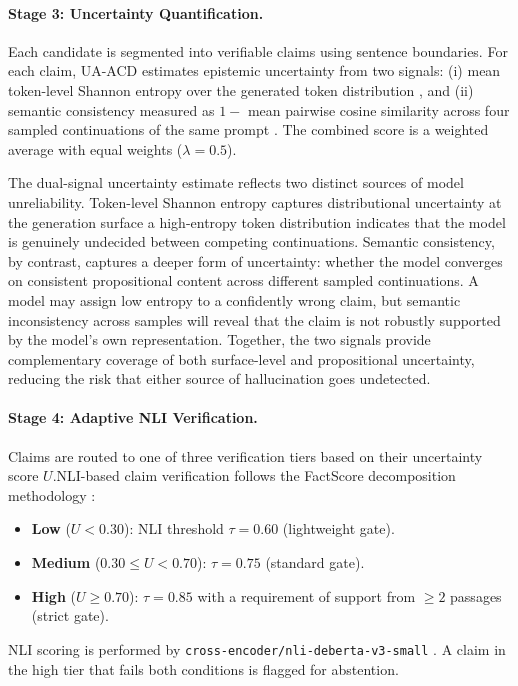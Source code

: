 \documentclass[11pt]{article}
\begin{document}
\paragraph{Stage 3: Uncertainty Quantification.}
Each candidate is segmented into verifiable claims using sentence boundaries. For each claim, UA-ACD estimates epistemic uncertainty from two signals: (i) mean token-level Shannon entropy over the generated token distribution \citep{malinin2021uncertainty}, and (ii) semantic consistency measured as $1 -$ mean pairwise cosine similarity across four sampled continuations of the same prompt \citep{manakul2023selfcheckgpt}. The combined score is a weighted average with equal weights ($\lambda{=}0.5$).


The dual-signal uncertainty estimate reflects two distinct sources of model unreliability. Token-level Shannon entropy captures distributional uncertainty at the generation surface a high-entropy token distribution indicates that the model is genuinely undecided between competing continuations. Semantic consistency, by contrast, captures a deeper form of uncertainty: whether the model converges on consistent propositional content across different sampled continuations. A model may assign low entropy to a confidently wrong claim, but semantic inconsistency across samples will reveal that the claim is not robustly supported by the model's own representation. Together, the two signals provide complementary coverage of both surface-level and propositional uncertainty, reducing the risk that either source of hallucination goes undetected.

\paragraph{Stage 4: Adaptive NLI Verification.}
Claims are routed to one of three verification tiers based on their uncertainty score $U$.NLI-based claim verification follows the FactScore decomposition methodology \citep{min2023factscore}:
\begin{itemize}
  \item \textbf{Low} ($U < 0.30$): NLI threshold $\tau{=}0.60$
        (lightweight gate).
  \item \textbf{Medium} ($0.30 \le U < 0.70$): $\tau{=}0.75$
        (standard gate).
  \item \textbf{High} ($U \ge 0.70$): $\tau{=}0.85$ with a
        requirement of support from $\ge 2$ passages (strict gate).
\end{itemize} 
NLI scoring is performed by \texttt{cross-encoder/nli-deberta-v3-small} \citep{he2021deberta}. A claim in the high tier that fails both conditions is flagged for abstention.
\end{document}
